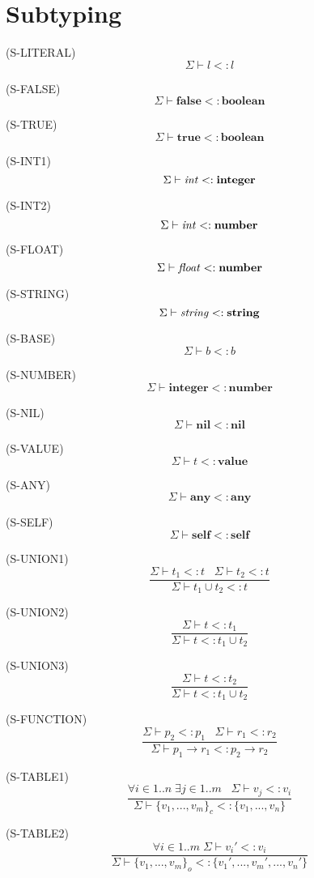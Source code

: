 \documentclass{paper}
\newcommand{\Value}{\mathbf{value}}
\newcommand{\Any}{\mathbf{any}}
\newcommand{\Nil}{\mathbf{nil}}
\newcommand{\Self}{\mathbf{self}}
\newcommand{\False}{\mathbf{false}}
\newcommand{\True}{\mathbf{true}}
\newcommand{\Boolean}{\mathbf{boolean}}
\newcommand{\Integer}{\mathbf{integer}}
\newcommand{\Number}{\mathbf{number}}
\newcommand{\String}{\mathbf{string}}
\newcommand{\mylabel}[1]{\; (\textsc{#1})}
\newcommand{\senv}{\Sigma}
\newcommand{\subtype}{<:}
\begin{document}
\section{Subtyping}

\noindent

\mylabel{S-LITERAL}
\[
\senv \vdash l \subtype l
\]

\mylabel{S-FALSE}
\[
\senv \vdash \False \subtype \Boolean
\]

\mylabel{S-TRUE}
\[
\senv \vdash \True \subtype \Boolean
\]

\mylabel{S-INT1}
\[
\senv \vdash {\it int} \subtype \Integer
\]

\mylabel{S-INT2}
\[
\senv \vdash {\it int} \subtype \Number
\]

\mylabel{S-FLOAT}
\[
\senv \vdash {\it float} \subtype \Number
\]

\mylabel{S-STRING}
\[
\senv \vdash {\it string} \subtype \String
\]

\mylabel{S-BASE}
\[
\senv \vdash b \subtype b
\]

\mylabel{S-NUMBER}
\[
\senv \vdash \Integer \subtype \Number
\]

\mylabel{S-NIL}
\[
\senv \vdash \Nil \subtype \Nil
\]

\mylabel{S-VALUE}
\[
\senv \vdash t \subtype \Value
\]

\mylabel{S-ANY}
\[
\senv \vdash \Any \subtype \Any
\]

\mylabel{S-SELF}
\[
\senv \vdash \Self \subtype \Self
\]

\mylabel{S-UNION1}
\[
\dfrac{\senv \vdash t_{1} \subtype t \;\;\;
       \senv \vdash t_{2} \subtype t}
      {\senv \vdash t_{1} \cup t_{2} \subtype t}
\]

\mylabel{S-UNION2}
\[
\dfrac{\senv \vdash t \subtype t_{1}}
      {\senv \vdash t \subtype t_{1} \cup t_{2}}
\]

\mylabel{S-UNION3}
\[
\dfrac{\senv \vdash t \subtype t_{2}}
      {\senv \vdash t \subtype t_{1} \cup t_{2}}
\]

\mylabel{S-FUNCTION}
\[
\dfrac{\senv \vdash p_{2} \subtype p_{1} \;\;\;
       \senv \vdash r_{1} \subtype r_{2}}
      {\senv \vdash p_{1} \rightarrow r_{1} \subtype p_{2} \rightarrow r_{2}}
\]

\mylabel{S-TABLE1}
\[
\dfrac{\forall i \in 1..n \; \exists j \in 1..m \;\;\;
       \senv \vdash v_{j} \subtype v_{i}}
      {\senv \vdash \{v_{1}, ..., v_{m}\}_{c} \subtype \{v_{1}, ..., v_{n}\}}
\]

\mylabel{S-TABLE2}
\[
\dfrac{\forall i \in 1..m \; \senv \vdash v_{i}' \subtype v_{i}}
      {\senv \vdash \{v_{1}, ..., v_{m}\}_{o} \subtype \{v_{1}', ..., v_{m}', ..., v_{n}'\}}
\]
\end{document}
